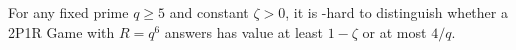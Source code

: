 \begin{theorem} \label{thm:main} For any fixed
prime $q \geq 5$ and constant $\zeta > 0$,
it is -hard to distinguish whether a 2P1R Game
with $R = q^6$ answers has value at least $1-\zeta$ or at most ${4}/{q}$.
\end{theorem}
